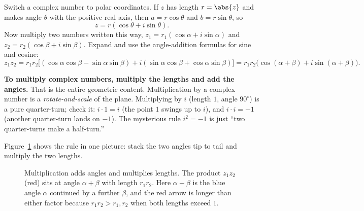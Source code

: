 Switch a complex number to polar coordinates. If $z$ has length $r = \abs{z}$ and makes angle
$\theta$ with the positive real axis, then $a = r\cos\theta$ and $b = r\sin\theta$, so
\[
z = r(\cos\theta + i\sin\theta).
\]
Now multiply two numbers written this way, $z_1 = r_1(\cos\alpha + i\sin\alpha)$ and $z_2 =
r_2(\cos\beta + i\sin\beta)$. Expand and use the angle-addition formulas for sine and cosine:
\[
z_1 z_2 = r_1 r_2\bigl[(\cos\alpha\cos\beta - \sin\alpha\sin\beta) + i(\sin\alpha\cos\beta +
\cos\alpha\sin\beta)\bigr] = r_1 r_2\bigl(\cos(\alpha+\beta) + i\sin(\alpha+\beta)\bigr).
\]

\begin{intuitionbox}
\textbf{To multiply complex numbers, multiply the lengths and add the angles.} That is the entire
geometric content. Multiplication by a complex number is a \emph{rotate-and-scale} of the plane.
Multiplying by $i$ (length $1$, angle $90^\circ$) is a pure quarter-turn; check it: $i\cdot 1 = i$
(the point $1$ swings up to $i$), and $i\cdot i = -1$ (another quarter-turn lands on $-1$). The
mysterious rule $i^2 = -1$ is just ``two quarter-turns make a half-turn.''
\end{intuitionbox}

Figure~\ref{ch39:fig-mult} shows the rule in one picture: stack the two angles tip to tail and
multiply the two lengths.

\begin{figure}[H]
\centering
{}
\caption{Multiplication adds angles and multiplies lengths. The product $z_1 z_2$ (red) sits at angle
$\alpha+\beta$ with length $r_1 r_2$. Here $\alpha+\beta$ is the blue angle $\alpha$ continued by a
further $\beta$, and the red arrow is longer than either factor because $r_1 r_2 > r_1, r_2$ when both
lengths exceed $1$.}
\label{ch39:fig-mult}
\end{figure}


